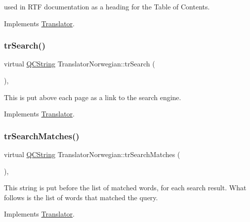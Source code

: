 used in R\+TF documentation as a heading for the Table of Contents. 

Implements \mbox{\hyperlink{class_translator}{Translator}}.

\mbox{\label{class_translator_norwegian_a7cee2d49aedfd0694f2a8bf96bc49b85}} 
\subsubsection{\texorpdfstring{trSearch()}{trSearch()}}
{\footnotesize\ttfamily virtual \mbox{\hyperlink{class_q_c_string}{Q\+C\+String}} Translator\+Norwegian\+::tr\+Search (\begin{DoxyParamCaption}{ }\end{DoxyParamCaption})\hspace{0.3cm}{\ttfamily [inline]}, {\ttfamily [virtual]}}

This is put above each page as a link to the search engine. 

Implements \mbox{\hyperlink{class_translator}{Translator}}.

\mbox{\label{class_translator_norwegian_ad58212ebc2e1025eeb79a01886127697}} 
\subsubsection{\texorpdfstring{trSearchMatches()}{trSearchMatches()}}
{\footnotesize\ttfamily virtual \mbox{\hyperlink{class_q_c_string}{Q\+C\+String}} Translator\+Norwegian\+::tr\+Search\+Matches (\begin{DoxyParamCaption}{ }\end{DoxyParamCaption})\hspace{0.3cm}{\ttfamily [inline]}, {\ttfamily [virtual]}}

This string is put before the list of matched words, for each search result. What follows is the list of words that matched the query. 

Implements \mbox{\hyperlink{class_translator}{Translator}}.

\mbox{\label{class_translator_norwegian_ad29c3555c4f77e08afde69b18aa3a984}} 

